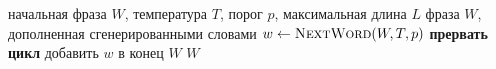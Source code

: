 \documentclass[a4paper,12pt]{article}
\begin{document}
\begin{algorithm}
\caption{Генерация подписи}\label{alg:gen}
\begin{algorithmic}[1]
\Require начальная фраза $W$, температура $T$, порог $p$, максимальная длина $L$
\Ensure фраза $W$, дополненная сгенерированными словами
        \State $w \gets \Call{NextWord}{W, T, p}$
            \State \textbf{прервать цикл}
        \EndIf
        \State добавить $w$ в конец $W$
    \EndFor
    \State \Return $W$
\EndFunction
\end{algorithmic}
\end{algorithm}
\end{document}
